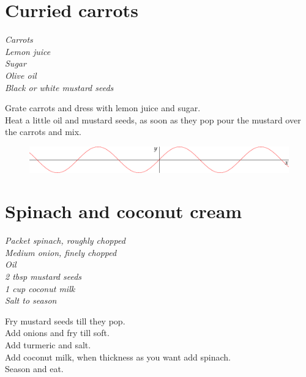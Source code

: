 \documentclass{tufte-book}
\begin{document}

\section{Curried carrots}
\emph{Carrots
\\Lemon juice
\\Sugar
\\Olive oil
\\Black or white mustard seeds
}

Grate carrots and dress with lemon juice and sugar.
\\Heat a little oil and mustard seeds, as soon as they pop pour the mustard over the carrots and mix.

\begin{figure}[h]
  \includegraphics[width=\linewidth]{sine.pdf}%
\end{figure}



\section{Spinach and coconut cream}
\emph{Packet spinach, roughly chopped
\\Medium onion, finely chopped
\\Oil
\\2 tbsp mustard seeds
\\1 cup coconut milk
\\Salt to season
}

Fry mustard seeds till they pop.
\\Add onions and fry till soft.
\\Add turmeric and salt.
\\Add coconut milk, when thickness as you want add spinach.
\\Season and eat.

\end{document}
